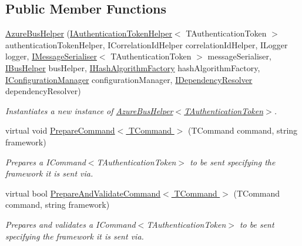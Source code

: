 \subsection*{Public Member Functions}
\begin{DoxyCompactItemize}
\item 
\hyperlink{classCqrs_1_1Azure_1_1ServiceBus_1_1AzureBusHelper_aed54a79efffdf9799a3baae46c2b7fb4_aed54a79efffdf9799a3baae46c2b7fb4}{Azure\+Bus\+Helper} (\hyperlink{interfaceCqrs_1_1Authentication_1_1IAuthenticationTokenHelper}{I\+Authentication\+Token\+Helper}$<$ T\+Authentication\+Token $>$ authentication\+Token\+Helper, I\+Correlation\+Id\+Helper correlation\+Id\+Helper, I\+Logger logger, \hyperlink{interfaceCqrs_1_1Azure_1_1ServiceBus_1_1IMessageSerialiser}{I\+Message\+Serialiser}$<$ T\+Authentication\+Token $>$ message\+Serialiser, \hyperlink{interfaceCqrs_1_1Bus_1_1IBusHelper}{I\+Bus\+Helper} bus\+Helper, \hyperlink{interfaceCqrs_1_1Bus_1_1IHashAlgorithmFactory}{I\+Hash\+Algorithm\+Factory} hash\+Algorithm\+Factory, \hyperlink{interfaceCqrs_1_1Configuration_1_1IConfigurationManager}{I\+Configuration\+Manager} configuration\+Manager, \hyperlink{interfaceCqrs_1_1Configuration_1_1IDependencyResolver}{I\+Dependency\+Resolver} dependency\+Resolver)
\begin{DoxyCompactList}\small\item\em Instantiates a new instance of \hyperlink{classCqrs_1_1Azure_1_1ServiceBus_1_1AzureBusHelper_aed54a79efffdf9799a3baae46c2b7fb4_aed54a79efffdf9799a3baae46c2b7fb4}{Azure\+Bus\+Helper$<$\+T\+Authentication\+Token$>$}. \end{DoxyCompactList}\item 
virtual void \hyperlink{classCqrs_1_1Azure_1_1ServiceBus_1_1AzureBusHelper_abdcc74e09f97a259f16d04e2af454002_abdcc74e09f97a259f16d04e2af454002}{Prepare\+Command$<$ T\+Command $>$} (T\+Command command, string framework)
\begin{DoxyCompactList}\small\item\em Prepares a I\+Command$<$\+T\+Authentication\+Token$>$ to be sent specifying the framework it is sent via. \end{DoxyCompactList}\item 
virtual bool \hyperlink{classCqrs_1_1Azure_1_1ServiceBus_1_1AzureBusHelper_a4d03f55a58a018fbbf6fd518ad9b24f8_a4d03f55a58a018fbbf6fd518ad9b24f8}{Prepare\+And\+Validate\+Command$<$ T\+Command $>$} (T\+Command command, string framework)
\begin{DoxyCompactList}\small\item\em Prepares and validates a I\+Command$<$\+T\+Authentication\+Token$>$ to be sent specifying the framework it is sent via. \end{DoxyCompactList}\item 

\end{DoxyCompactItemize}
